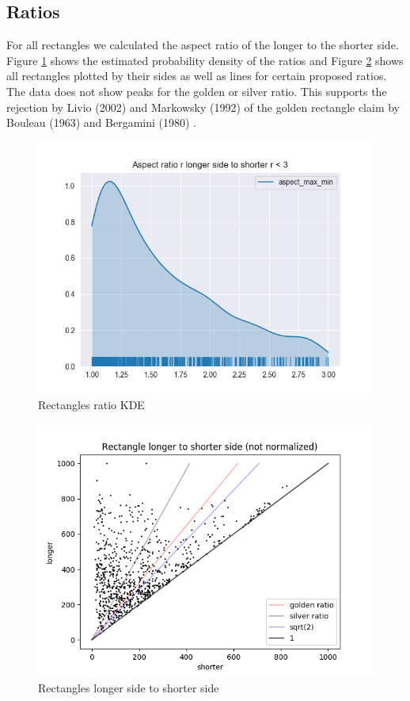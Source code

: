 \documentclass[serif,article,noparskip]{agse-thesis}
\begin{document}
\subsection{Ratios} \label{ratios}

For all rectangles we calculated the aspect ratio of the longer to the shorter
side. Figure \ref{fig:aspect-rects} shows the estimated probability density of
the ratios and Figure \ref{fig:longer-x-shorter} shows all rectangles plotted by
their sides as well as lines for certain proposed ratios. The data does not show
peaks for the golden or silver ratio. This supports the rejection by Livio
(2002) \cite{Livio2002} and Markowsky (1992) \cite{Markowsky1992} of the golden
rectangle claim by Bouleau (1963) \cite{bouleau1963} and Bergamini (1980)
\cite{bergamini1980}.

\begin{figure}
\includegraphics[width=\linewidth]{images/aspect-max-min-rects.png}
\caption{Rectangles ratio KDE}
\label{fig:aspect-rects}
\end{figure}

\begin{figure}
\includegraphics[width=\linewidth]{images/longer-x-shorter.png}
\caption{Rectangles longer side to shorter side}
\label{fig:longer-x-shorter}
\end{figure}
\end{document}
